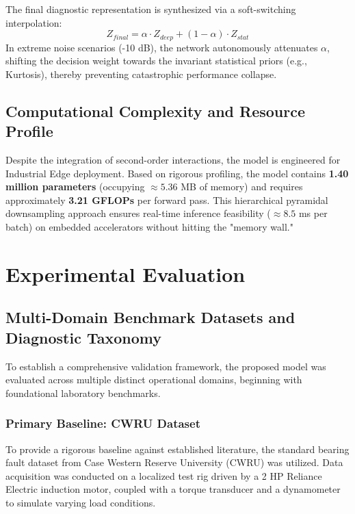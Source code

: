 \documentclass[5p,times,twocolumn]{elsarticle}
\begin{document}
The final diagnostic representation is synthesized via a soft-switching interpolation:
\begin{equation}
Z_{final} = \alpha \cdot Z_{deep} + (1-\alpha) \cdot Z_{stat}
\end{equation}
In extreme noise scenarios (-10 dB), the network autonomously attenuates $\alpha$, shifting the decision weight towards the invariant statistical priors (e.g., Kurtosis), thereby preventing catastrophic performance collapse.

\subsection{Computational Complexity and Resource Profile}
Despite the integration of second-order interactions, the model is engineered for Industrial Edge deployment. Based on rigorous profiling, the model contains \textbf{1.40 million parameters} (occupying $\approx 5.36$ MB of memory) and requires approximately \textbf{3.21 GFLOPs} per forward pass. This hierarchical pyramidal downsampling approach ensures real-time inference feasibility ($\approx 8.5$ ms per batch) on embedded accelerators without hitting the "memory wall."

\section{Experimental Evaluation}
\label{sec:experiments}

\subsection{Multi-Domain Benchmark Datasets and Diagnostic Taxonomy}
\label{subsec:datasets}
To establish a comprehensive validation framework, the proposed model was evaluated across multiple distinct operational domains, beginning with foundational laboratory benchmarks.

\subsubsection{Primary Baseline: CWRU Dataset}
To provide a rigorous baseline against established literature, the standard bearing fault dataset from Case Western Reserve University (CWRU) was utilized. Data acquisition was conducted on a localized test rig driven by a 2 HP Reliance Electric induction motor, coupled with a torque transducer and a dynamometer to simulate varying load conditions.
\end{document}
